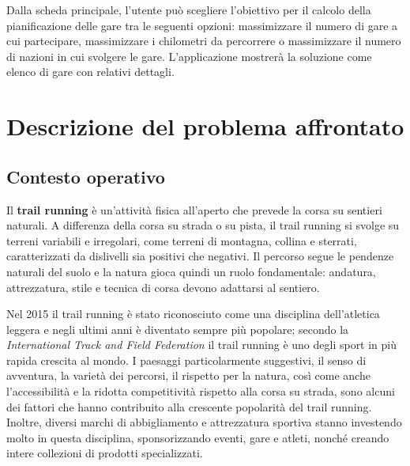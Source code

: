 \documentclass[a4paper, 12pt, oneside]{book}
\begin{document}
Dalla scheda principale, l'utente può scegliere l'obiettivo per il calcolo della pianificazione delle gare tra le seguenti opzioni: massimizzare il numero di gare a cui partecipare, massimizzare i chilometri da percorrere o massimizzare il numero di nazioni in cui svolgere le gare. L'applicazione mostrerà la soluzione come elenco di gare con relativi dettagli.

\chapter{Descrizione del problema affrontato}
\section{Contesto operativo}
Il \textbf{trail running} è un'attività fisica all'aperto che prevede la corsa su sentieri naturali. A differenza della corsa su strada o su pista, il trail running si svolge su terreni variabili e irregolari, come terreni di montagna, collina e sterrati, caratterizzati da dislivelli sia positivi che negativi. Il percorso segue le pendenze naturali del suolo e la natura gioca quindi un ruolo fondamentale: andatura, attrezzatura, stile e tecnica di corsa devono adattarsi al sentiero. 

Nel 2015 il trail running è stato riconosciuto come una disciplina dell'atletica leggera e negli ultimi anni è diventato sempre più popolare; secondo la \textit{International Track and Field Federation} il trail running è uno degli sport in più rapida crescita al mondo. I paesaggi particolarmente suggestivi, il senso di avventura, la varietà dei percorsi, il rispetto per la natura, così come anche l'accessibilità e la ridotta competitività rispetto alla corsa su strada, sono alcuni dei fattori che hanno contribuito alla crescente popolarità del trail running. Inoltre, diversi marchi di abbigliamento e attrezzatura sportiva stanno investendo molto in questa disciplina, sponsorizzando eventi, gare e atleti, nonché creando intere collezioni di prodotti specializzati. 
\end{document}
